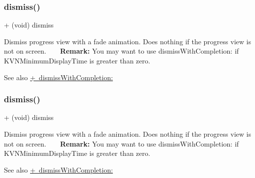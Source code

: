 \subsubsection{\texorpdfstring{dismiss()}{dismiss()}\hspace{0.1cm}{\footnotesize\ttfamily [2/3]}}
{\footnotesize\ttfamily + (void) dismiss \begin{DoxyParamCaption}{ }\end{DoxyParamCaption}}

Dismiss progress view with a fade animation. Does nothing if the progress view is not on screen. ~\newline
~\newline
{\bfseries Remark\+:} You may want to use {\ttfamily dismiss\+With\+Completion\+:} if {\ttfamily K\+V\+N\+Minimum\+Display\+Time} is greater than zero. \begin{DoxySeeAlso}{See also}
\mbox{\hyperlink{interface_k_v_n_progress_a7ec9c844ebb26d0f9cdff6ef3d737d28}{+ dismiss\+With\+Completion\+:}} 
\end{DoxySeeAlso}
\mbox{\label{interface_k_v_n_progress_a4b11cd2b647d08b5c05cf79b99e3f588}} 
\subsubsection{\texorpdfstring{dismiss()}{dismiss()}\hspace{0.1cm}{\footnotesize\ttfamily [3/3]}}
{\footnotesize\ttfamily + (void) dismiss \begin{DoxyParamCaption}{ }\end{DoxyParamCaption}}

Dismiss progress view with a fade animation. Does nothing if the progress view is not on screen. ~\newline
~\newline
{\bfseries Remark\+:} You may want to use {\ttfamily dismiss\+With\+Completion\+:} if {\ttfamily K\+V\+N\+Minimum\+Display\+Time} is greater than zero. \begin{DoxySeeAlso}{See also}
\mbox{\hyperlink{interface_k_v_n_progress_a7ec9c844ebb26d0f9cdff6ef3d737d28}{+ dismiss\+With\+Completion\+:}} 
\end{DoxySeeAlso}
\mbox{\label{interface_k_v_n_progress_a7ec9c844ebb26d0f9cdff6ef3d737d28}} 
